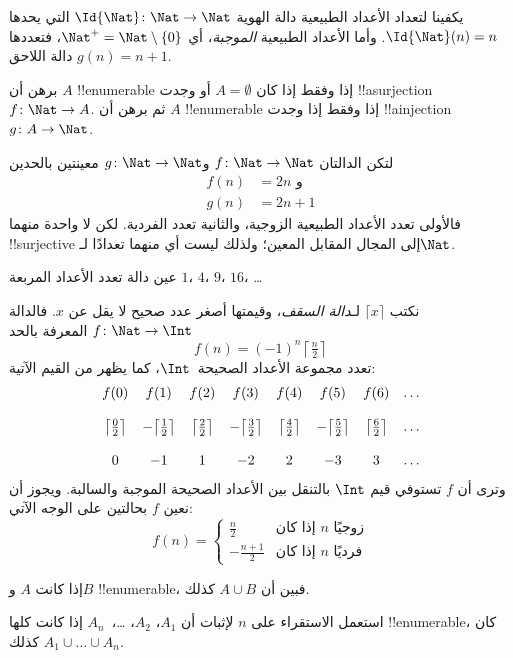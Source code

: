 \documentclass[../../../include/open-logic-section]{subfiles}
\begin{document}
\begin{ex}
يكفينا لتعداد الأعداد الطبيعية دالة الهوية $\Id{\Nat} \colon \Nat \to \Nat$ التي يحدها $\Id{\Nat}(n) = n$. وأما الأعداد الطبيعية \emph{الموجبة}، أي $\Nat^+ =
\Nat \setminus \{0\}$، فتعددها دالة اللاحق $g(n) = n + 1$.
\end{ex}

\begin{prob}
برهن أن $A$ !!{enumerable} إذا وفقط إذا كان $A = \emptyset$ أو وجدت !!a{surjection} $f\colon \Nat \to A$. ثم برهن أن $A$ !!{enumerable} إذا وفقط إذا وجدت !!a{injection} $g\colon A \to \Nat$.
\end{prob}

\begin{ex}
لتكن الدالتان $f\colon \Nat \to \Nat$ و$g \colon \Nat \to \Nat$ معينتين بالحدين
\begin{align*}
  f(n) & = 2n \text{ و}\\
  g(n) & = 2n+1
\end{align*}
فالأولى تعدد الأعداد الطبيعية الزوجية، والثانية تعدد الفردية. لكن لا واحدة منهما !!{surjective} إلى المجال المقابل المعين؛ ولذلك ليست أي منهما تعدادًا لـ$\Nat$.
\end{ex}

\begin{prob}
عين دالة تعدد الأعداد المربعة $1$، $4$، $9$، $16$، \dots
\end{prob}

\begin{ex}
نكتب $\lceil x \rceil$ لـ\emph{دالة السقف}، وقيمتها أصغر عدد صحيح لا يقل عن $x$. فالدالة $f \colon \Nat \to \Int$ المعرفة بالحد
\[
  f(n) = (-1)^{n} \left\lceil\tfrac{n}{2}\right\rceil
\]
تعدد مجموعة الأعداد الصحيحة~$\Int$، كما يظهر من القيم الآتية:
\[
\begin{array}{c c c c c c c c}
f(0) & f(1) & f(2) & f(3) & f(4) & f(5) & f(6) & \dots \\ \\
\big\lceil \tfrac{0}{2} \big\rceil & -\big\lceil \tfrac{1}{2}\big\rceil &  \big\lceil \tfrac{2}{2} \big\rceil & -\big\lceil \tfrac{3}{2} \big\rceil & \big\lceil \tfrac{4}{2} \big\rceil  & -\big\lceil \tfrac{5}{2}\big\rceil & \big\lceil \tfrac{6}{2} \big\rceil & \dots \\ \\
0 & -1 & 1 & -2 & 2 & -3 & 3& \dots
\end{array}
\]
وترى أن $f$ تستوفي قيم $\Int$ بالتنقل بين الأعداد الصحيحة الموجبة والسالبة. ويجوز أن نعين $f$ بحالتين على الوجه الآتي:
\[
f(n) = \begin{cases}
  \frac{n}{2} & \text{إذا كان $n$ زوجيًا}\\
  -\frac{n+1}{2} & \text{إذا كان $n$ فرديًا}
  \end{cases}
\]
\end{ex}

\begin{prob}
إذا كانت $A$ و$B$ !!{enumerable}، فبين أن $A \cup B$ كذلك.
\end{prob}

\begin{prob}
استعمل الاستقراء على $n$ لإثبات أن $A_1$، $A_2$، \dots،~$A_n$ إذا كانت كلها !!{enumerable}، كان $A_1 \cup \dots \cup A_n$ كذلك.
\end{prob}
\end{document}

